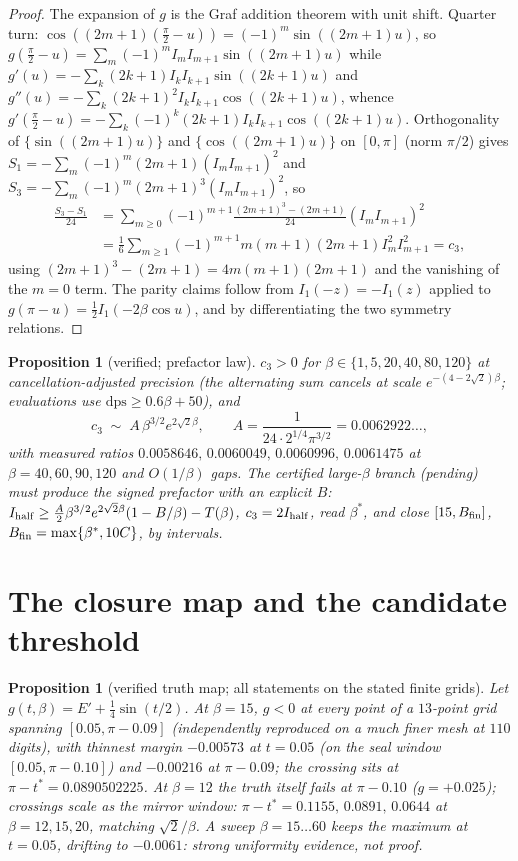 \documentclass[11pt]{article}
\newtheorem{proposition}[theorem]{Proposition}
\theoremstyle{remark}
\begin{document}
\begin{proof}
The expansion of $g$ is the Graf addition theorem with unit shift.
Quarter turn: $\cos((2m+1)(\tfrac\pi2-u))=(-1)^m\sin((2m+1)u)$, so
$g(\tfrac\pi2-u)=\sum_m(-1)^mI_mI_{m+1}\sin((2m+1)u)$ while
$g'(u)=-\sum_k(2k+1)I_kI_{k+1}\sin((2k+1)u)$ and
$g''(u)=-\sum_k(2k+1)^2I_kI_{k+1}\cos((2k+1)u)$, whence
$g'(\tfrac\pi2-u)=-\sum_k(-1)^k(2k+1)I_kI_{k+1}\cos((2k+1)u)$.
Orthogonality of $\{\sin((2m+1)u)\}$ and $\{\cos((2m+1)u)\}$ on
$[0,\pi]$ (norm $\pi/2$) gives
$S_1=-\sum_m(-1)^m(2m+1)(I_mI_{m+1})^2$ and
$S_3=-\sum_m(-1)^m(2m+1)^3(I_mI_{m+1})^2$, so
\begin{align*}
\frac{S_3-S_1}{24}
&=\sum_{m\ge0}(-1)^{m+1}\frac{(2m+1)^3-(2m+1)}{24}(I_mI_{m+1})^2\\
&=\frac16\sum_{m\ge1}(-1)^{m+1}m(m+1)(2m+1)I_m^2I_{m+1}^2=c_3,
\end{align*}
using $(2m+1)^3-(2m+1)=4m(m+1)(2m+1)$ and the vanishing of the $m=0$
term. The parity claims follow from $I_1(-z)=-I_1(z)$ applied to
$g(\pi-u)=\tfrac12I_1(-2\beta\cos u)$, and by differentiating the two
symmetry relations.
\end{proof}

\begin{proposition}[verified; prefactor law]\label{prop:prefactor}
$c_3>0$ for $\beta\in\{1,5,20,40,80,120\}$ at cancellation-adjusted
precision \textup{(the alternating sum cancels at scale
$e^{-(4-2\sqrt2)\beta}$; evaluations use $\mathrm{dps}\ge0.6\beta+50$)},
and
\[
c_3\;\sim\;A\,\beta^{3/2}e^{2\sqrt2\beta},\qquad
A=\frac{1}{24\cdot2^{1/4}\pi^{3/2}}=0.0062922\ldots,
\]
with measured ratios $0.0058646,\,0.0060049,\,0.0060996,\,0.0061475$ at
$\beta=40,60,90,120$ and $O(1/\beta)$ gaps. The certified large-$\beta$
branch (pending) must produce the signed prefactor with an explicit
$B$: $I_{\rm half}\ge\frac{A}{2}\beta^{3/2}e^{2\sqrt2\beta}(1-B/\beta)
-T(\beta)$, $c_3=2I_{\rm half}$, read $\beta^*$, and close
$[15,B_{\rm fin}]$, $B_{\rm fin}=\max\{\beta^*,10C\}$, by intervals.
\end{proposition}

\section{The closure map and the candidate threshold}\label{sec:closure}

\begin{proposition}[verified truth map; all statements on the stated
finite grids]\label{prop:truthmap}
Let $g(t,\beta)=E'+\tfrac14\sin(t/2)$. At $\beta=15$, $g<0$ at every
point of a $13$-point grid spanning $[0.05,\pi-0.09]$ (independently
reproduced on a much finer mesh at $110$ digits), with thinnest margin $-0.00573$ at $t=0.05$ (on the
seal window $[0.05,\pi-0.10]$) and $-0.00216$ at $\pi-0.09$; the
crossing sits at $\pi-t^*=0.0890502225$. At $\beta=12$ the truth itself
fails at $\pi-0.10$ ($g=+0.025$); crossings scale as the mirror window:
$\pi-t^*=0.1155,\,0.0891,\,0.0644$ at $\beta=12,15,20$, matching
$\sqrt2/\beta$. A sweep $\beta=15\ldots60$ keeps the maximum at $t=0.05$,
drifting to $-0.0061$: strong uniformity evidence, not proof.
\end{proposition}
\end{document}
